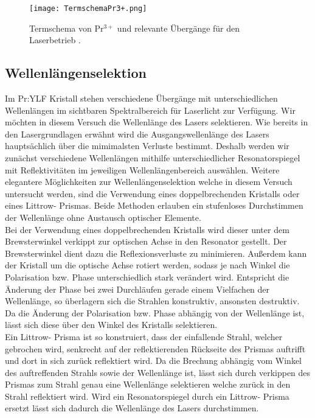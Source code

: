 \begin{figure}[H]
\begin{center}
  \texttt{[image: TermschemaPr3+.png]}
  \caption{Termschema von Pr$^{3+}$ und relevante Übergänge für den Laserbetrieb
  \cite{Versuchsanleitung}.}
  \label{img:Termschema}
\end{center}
\end{figure}

\subsection{Wellenlängenselektion}


Im Pr:YLF Kristall stehen verschiedene Übergänge mit unterschiedlichen Wellenlängen im sichtbaren
Spektralbereich für Laserlicht zur Verfügung.
Wir möchten in diesem Versuch die Wellenlänge des Lasers selektieren.
Wie bereits in den Lasergrundlagen erwähnt wird die Ausgangswellenlänge des Lasers hauptsächlich über die mimimalsten Verluste bestimmt. Deshalb werden wir zunächst verschiedene Wellenlängen
 mithilfe unterschiedlicher Resonatorspiegel mit Reflektivitäten im jeweiligen Wellenlängenbereich
 auswählen.
Weitere elegantere Möglichkeiten zur Wellenlängenselektion welche in diesem Versuch untersucht
werden, sind die Verwendung eines doppelbrechenden Kristalls oder eines Littrow- Prismas.
Beide Methoden erlauben ein stufenloses Durchstimmen der Wellenlänge ohne Austausch optischer Elemente.\\

Bei der Verwendung eines doppelbrechenden Kristalls wird dieser unter dem Brewsterwinkel verkippt zur optischen Achse in den Resonator gestellt. Der Brewsterwinkel dient dazu die Reflexionsverluste zu minimieren. Außerdem kann der Kristall um die optische Achse rotiert werden, sodass je nach Winkel die Polarisation bzw. Phase unterschiedlich stark verändert wird. Entspricht die Änderung der Phase bei zwei Durchläufen gerade einem Vielfachen der Wellenlänge, so überlagern sich die Strahlen konstruktiv, ansonsten destruktiv.
Da die Änderung der Polarisation bzw. Phase abhängig von der Wellenlänge ist, lässt sich diese über den Winkel des Kristalls selektieren.\\

Ein Littrow- Prisma ist so konstruiert, dass der einfallende Strahl, welcher gebrochen wird, senkrecht auf der reflektierenden Rückseite des Prismas auftrifft und dort in sich zurück reflektiert wird. Da die Brechung abhängig vom Winkel des auftreffenden Strahls sowie der Wellenlänge ist, lässt sich durch verkippen des Prismas zum Strahl genau eine Wellenlänge selektieren welche zurück in den Strahl reflektiert wird. Wird ein Resonatorspiegel durch ein Littrow- Prisma ersetzt lässt sich dadurch die Wellenlänge des Lasers durchstimmen.


